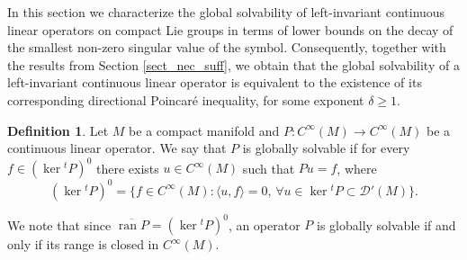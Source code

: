 \documentclass[11pt]{amsart}
\numberwithin{theorem}{section}
\numberwithin{equation}{section}
\theoremstyle{definition}
\numberwithin{example}{section}
\theoremstyle{definition}
\theoremstyle{definition}
\newtheorem{definition}[theorem]{Definition}
\begin{document}
In this section we characterize the global solvability of left-invariant continuous linear operators on compact Lie groups in terms of lower bounds on the decay of the smallest non-zero singular value of the symbol. Consequently,  together with the results from Section \ref{sect_nec_suff}, we obtain that the global solvability of a left-invariant continuous linear operator is equivalent to the existence of its corresponding directional Poincaré inequality, for some exponent $\delta\geq 1$.

\begin{definition}
    Let $M$ be a compact manifold and $P:C^\infty(M)\to C^\infty(M)$ be  a continuous linear operator. We say that $P$ is globally solvable if for every $f\in(\ker {}^tP)^{0}$ there exists $u\in C^\infty(M)$ such that $Pu=f$, where 
    \begin{equation*}
        (\ker {}^tP)^{0}=\{f\in C^\infty(M):\langle u,f\rangle=0,\,\forall u \in \ker {}^tP\subset \mathcal{D}'(M)\}.
    \end{equation*}
\end{definition}
We note that since $\overline{\operatorname{ran} P}=(\ker {}^tP)^{0}$, an operator $P$ is globally solvable if and only if its range is closed in $C^\infty(M)$.
\end{document}
